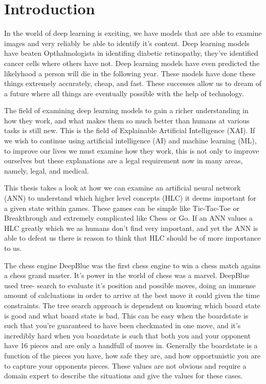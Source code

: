 \chapter{Introduction\label{cha:introduction}}

In the world of deep learning is exciting, we have models that are able to examine
images and very reliably be able to identify it's content. Deep learning models have
beaten Opthalmologists in identifing diabetic retinopathy, they've identified
cancer cells where others have not. Deep learning models have even predicted
the likelyhood a person will die in the following year. These models have done
these things extremely accurately, cheap, and fast. These successes allow us to
dream of a future where all things are eventually possible with the help of
technology.

The field of examining deep learning models to gain a richer understanding
in how they work, and what makes them so much better than humans at various tasks
is still new. This is the field of Explainable Artificial Intelligence (XAI).
If we wish to continue using artificial intelligence (AI) and machine learning (ML),
to improve our lives we must examine how they work, this is not only to improve
ourselves but these explanations are a legal requirement now in many areas, namely, legal, and
medical.

This thesis takes a look at how we can examine an artificial neural network (ANN)
to understand which higher level concepts (HLC) it deems important for a given state
within games. These games can be simple like Tic-Tac-Toe or Breakthrough and extremely
complicated like Chess or Go. If an ANN values a HLC greatly which we as humans don't find
very important, and yet the ANN is able to defeat us there is reason to think
that HLC should be of more importance to us.

The chess engine DeepBlue was the first chess engine to win a chess match agains a
chess grand master. It's power in the world of chess was a marvel. DeepBlue used tree-
search to evaluate it's position and possible moves, doing an immense amount of calcluations
in order to arrive at the best move it could given the time constraints. The tree search
approach is dependent on knowing which board state is good and what board state is bad,
This can be easy when the boardstate is such that you're guaranteed to have been checkmated
in one move, and it's incredibly hard when you boardstate is such that both you and your
opponent have 16 pieces and are only a handfull of moves in. Generally the boardstate
is a function of the pieces you have, how safe they are, and how opportunistic you are to
capture your opponents pieces. These values are not obvious and require a domain expert
to describe the situations and give the values for these cases.

